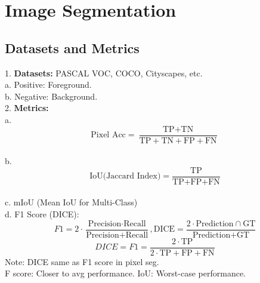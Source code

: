 \section{Image Segmentation}
\subsection{Datasets and Metrics}
1. \textbf{Datasets:} PASCAL VOC, COCO, Cityscapes, etc. \\
   a. Positive: Foreground. \\
   b. Negative: Background. \\
2. \textbf{Metrics:} \\
   a. \[
      \text{Pixel Acc} = \frac{\text{TP} + \text{TN}}{\text{TP} + \text{TN} + \text{FP} + \text{FN}}
      \] \\
   b. 
      \[
      \text{IoU(Jaccard Index)} = \frac{\text{TP}}{\text{TP+FP+FN}}
      \] \\
   c. mIoU (Mean IoU for Multi-Class) \\
   d. F1 Score (DICE): 
      \[
      F1 = 2 \cdot \frac{\text{Precision} \cdot \text{Recall}}{\text{Precision} + \text{Recall}}, 
    \text{DICE} = \frac{2 \cdot \text{Prediction} \cap \text{GT}}{\text{Prediction} + \text{GT}}
    \] 
    \[
    DICE = F1 = \frac{2 \cdot \text{TP}}{2 \cdot \text{TP} + \text{FP} + \text{FN}}
    \]
   Note: DICE same as F1 score in pixel seg.\\
   F score: Closer to avg performance. IoU: Worst-case performance.


